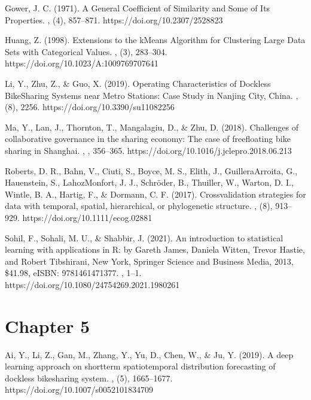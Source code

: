 \documentclass[letterpaper,10pt,english]{jupyterBook}
\begin{document}
\sphinxAtStartPar
Gower, J. C. (1971). A General Coefficient of Similarity and Some of Its Properties. , (4), 857–871. https://doi.org/10.2307/2528823

\sphinxAtStartPar
Huang, Z. (1998). Extensions to the k\sphinxhyphen{}Means Algorithm for Clustering Large Data Sets with Categorical Values. , (3), 283–304. https://doi.org/10.1023/A:1009769707641

\sphinxAtStartPar
Li, Y., Zhu, Z., \& Guo, X. (2019). Operating Characteristics of Dockless Bike\sphinxhyphen{}Sharing Systems near Metro Stations: Case Study in Nanjing City, China. , (8), 2256. https://doi.org/10.3390/su11082256

\sphinxAtStartPar
Ma, Y., Lan, J., Thornton, T., Mangalagiu, D., \& Zhu, D. (2018). Challenges of collaborative governance in the sharing economy: The case of free\sphinxhyphen{}floating bike sharing in Shanghai. , , 356–365. https://doi.org/10.1016/j.jclepro.2018.06.213

\sphinxAtStartPar
Roberts, D. R., Bahn, V., Ciuti, S., Boyce, M. S., Elith, J., Guillera\sphinxhyphen{}Arroita, G., Hauenstein, S., Lahoz\sphinxhyphen{}Monfort, J. J., Schröder, B., Thuiller, W., Warton, D. I., Wintle, B. A., Hartig, F., \& Dormann, C. F. (2017). Cross\sphinxhyphen{}validation strategies for data with temporal, spatial, hierarchical, or phylogenetic structure. , (8), 913–929. https://doi.org/10.1111/ecog.02881

\sphinxAtStartPar
Sohil, F., Sohali, M. U., \& Shabbir, J. (2021). An introduction to statistical learning with applications in R: by Gareth James, Daniela Witten, Trevor Hastie, and Robert Tibshirani, New York, Springer Science and Business Media, 2013, \$41.98, eISBN: 978\sphinxhyphen{}1\sphinxhyphen{}4614\sphinxhyphen{}7137\sphinxhyphen{}7. , 1–1. https://doi.org/10.1080/24754269.2021.1980261


\section{Chapter 5}
\label{\detokenize{references:chapter-5}}
\sphinxAtStartPar
Ai, Y., Li, Z., Gan, M., Zhang, Y., Yu, D., Chen, W., \& Ju, Y. (2019). A deep learning approach on short\sphinxhyphen{}term spatiotemporal distribution forecasting of dockless bike\sphinxhyphen{}sharing system. , (5), 1665–1677. https://doi.org/10.1007/s00521\sphinxhyphen{}018\sphinxhyphen{}3470\sphinxhyphen{}9
\end{document}
